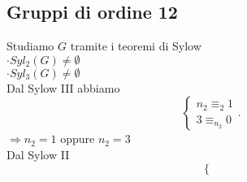 \documentclass[12px]{article}
\begin{document}
{\begin{dimo}
	\end{dimo}
	\subsection{Gruppi di ordine 12}
	Studiamo $G$ tramite i teoremi di Sylow\\
	$\cdot Syl_2(G)\neq \emptyset$\\
	 $\cdot Syl_3(G)\neq\emptyset$ \\
	 Dal Sylow III abbiamo
	 \[
	 \begin{cases}
	 	n_2 \equiv_2 1\\
		3\equiv_{n_2} 0
	 \end{cases}
	 .\] 
	 $ \Rightarrow n_2= 1$ oppure $n_2 = 3$\\
	 Dal Sylow II
	  \[
		  \begin{cases}
		  	

\end{cases}\]}
\end{document}
